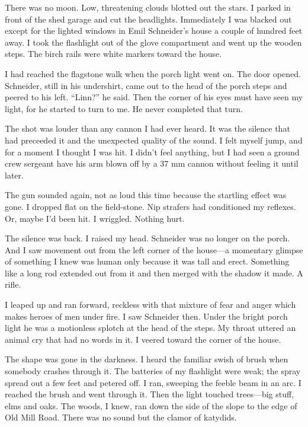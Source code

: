 \documentclass{novel}
\begin{document}
{There was no moon. Low, threatening clouds blotted out the stars. I parked in front of the shed garage and cut the headlights. Immediately I was blacked out except for the lighted windows in Emil Schneider’s house a couple of hundred feet away. I took the flashlight out of the glove compartment and went up the wooden steps. The birch rails were white markers toward the house.

I had reached the flagstone walk when the porch light went on. The door opened. Schneider, still in his undershirt, came out to the head of the porch steps and peered to his left. “Linn?” he said. Then the corner of his eyes must have seen my light, for he started to turn to me. He never completed that turn.

The shot was louder than any cannon I had ever heard. It was the silence that had preceeded it and the unexpected quality of the sound. I felt myself jump, and for a moment I thought I was hit. I didn’t feel anything, but I had seen a ground crew sergeant have his arm blown off by a 37 mm cannon without feeling it until later.

The gun sounded again, not as loud this time because the startling effect was gone. I dropped flat on the field-stone. Nip strafers had conditioned my reflexes. Or, maybe I’d been hit. I wriggled. Nothing hurt.

The silence was back. I raised my head. Schneider was no longer on the porch. And I saw movement out from the left corner of the house—a momentary glimpse of something I knew was human only because it was tall and erect. Something like a long rod extended out from it and then merged with the shadow it made. A rifle.

I leaped up and ran forward, reckless with that mixture of fear and anger which makes heroes of men under fire. I saw Schneider then. Under the bright porch light he was a motionless splotch at the head of the steps. My throat uttered an animal cry that had no words in it. I veered toward the corner of the house.

The shape was gone in the darkness. I heard the familiar swish of brush when somebody crashes through it. The batteries of my flashlight were weak; the spray spread out a few feet and petered off. I ran, sweeping the feeble beam in an arc. I reached the brush and went through it. Then the light touched trees—big stuff, elms and oaks. The woods, I knew, ran down the side of the slope to the edge of Old Mill Road. There was no sound but the clamor of katydids.

}
\end{document}
